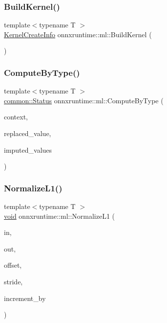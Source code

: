 \subsubsection{\texorpdfstring{Build\+Kernel()}{BuildKernel()}}
{\footnotesize\ttfamily template$<$typename T $>$ \\
\mbox{\hyperlink{structonnxruntime_1_1KernelCreateInfo}{Kernel\+Create\+Info}} onnxruntime\+::ml\+::\+Build\+Kernel (\begin{DoxyParamCaption}{ }\end{DoxyParamCaption})}

\mbox{\label{namespaceonnxruntime_1_1ml_ae476dce0c2b6b1cb084069460f091270}} 
\subsubsection{\texorpdfstring{Compute\+By\+Type()}{ComputeByType()}}
{\footnotesize\ttfamily template$<$typename T $>$ \\
\mbox{\hyperlink{classonnxruntime_1_1common_1_1Status}{common\+::\+Status}} onnxruntime\+::ml\+::\+Compute\+By\+Type (\begin{DoxyParamCaption}\item[{\mbox{\hyperlink{classonnxruntime_1_1OpKernelContext}{Op\+Kernel\+Context}} $\ast$}]{context,  }\item[{T}]{replaced\+\_\+value,  }\item[{const std\+::vector$<$ T $>$ \&}]{imputed\+\_\+values }\end{DoxyParamCaption})}

\mbox{\label{namespaceonnxruntime_1_1ml_a728024f4161db1cc2bb78c176c44a30b}} 
\subsubsection{\texorpdfstring{Normalize\+L1()}{NormalizeL1()}}
{\footnotesize\ttfamily template$<$typename T $>$ \\
\mbox{\hyperlink{mlasi_8h_a88f941d423cb2a819b70a1358982b1a6}{void}} onnxruntime\+::ml\+::\+Normalize\+L1 (\begin{DoxyParamCaption}\item[{const gsl\+::span$<$ const T $>$ \&}]{in,  }\item[{gsl\+::span$<$ float $>$ \&}]{out,  }\item[{int64\+\_\+t}]{offset,  }\item[{int64\+\_\+t}]{stride,  }\item[{int64\+\_\+t}]{increment\+\_\+by }\end{DoxyParamCaption})}

